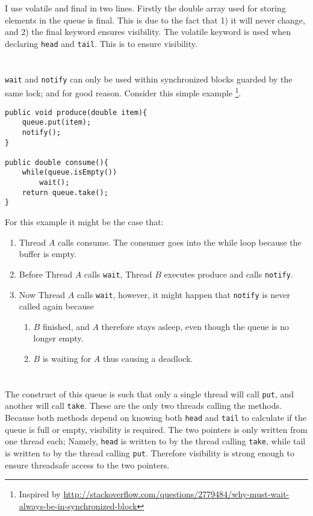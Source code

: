 \documentclass{ituhandin}
\begin{document}
I use volatile and final in two lines. Firstly the double array used for storing elements in the queue is final. This is due to the fact that 1) it will never change, and 2) the final keyword ensures visibility. The volatile keyword is used when declaring \texttt{head} and \texttt{tail}. This is to ensure visibility. 

\section{} %
\texttt{wait} and \texttt{notify} can only be used within synchronized blocks guarded by the same lock; and for good reason. Consider this simple example \footnote{Inspired by \url{http://stackoverflow.com/questions/2779484/why-must-wait-always-be-in-synchronized-block}}.

\begin{lstlisting}[frame={}]
public void produce(double item){
    queue.put(item);
    notify();
}

public double consume(){
    while(queue.isEmpty())
        wait();
    return queue.take();
}
\end{lstlisting}
For this example it might be the case that: 
\begin{enumerate}
        \item Thread $A$ calls consume. The consumer goes into the while loop because the buffer is empty.
        \item Before Thread $A$ calls \texttt{wait}, Thread $B$ executes produce and calls \texttt{notify}.
        \item Now Thread $A$ calls \texttt{wait}, however, it might happen that \texttt{notify} is never called again because
        \begin{enumerate}
            \item $B$ finished, and $A$ therefore stays asleep, even though the queue is no longer empty. 
            \item $B$ is waiting for $A$ thus causing a deadlock.
        \end{enumerate}
\end{enumerate}
\section{} %
The construct of this queue is such that only a single thread will call \texttt{put}, and another will call \texttt{take}. These are the only two threads calling the methods. Because both methods depend on knowing both \texttt{head} and \texttt{tail} to calculate if the queue is full or empty, visibility is required. 
The two pointers is only written from one thread each; Namely, \texttt{head} is written to by the thread calling \texttt{take}, while tail is written to by the thread calling \texttt{put}. Therefore visibility is strong enough to ensure threadsafe access to the two pointers. 
\end{document}

